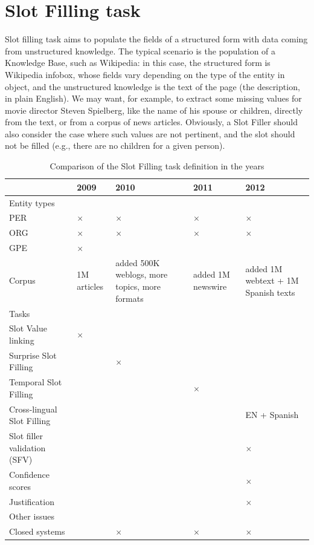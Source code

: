 \documentclass[a4paper,11pt]{report}
\newcommand{\tick}{$\times$}
\begin{document}
\section{Slot Filling task}
Slot filling task aims to populate the fields of a structured form with data coming from unstructured knowledge. The typical scenario is the population of a Knowledge Base, such as Wikipedia: in this case, the structured form is Wikipedia infobox, whose fields vary depending on the type of the entity in object, and the unstructured knowledge is the text of the page (the description, in plain English).
We may want, for example, to extract some missing values for movie director Steven Spielberg, like the name of his spouse or children, directly from the text, or from a corpus of news articles. Obviously, a Slot Filler should also consider the case where such values are not pertinent, and the slot should not be filled (e.g., there are no children for a given person).
\begin{table}
\begin{tabularx}{\linewidth}{lXXXX}
 & 2009 & 2010 & 2011 & 2012 \\
\hline Entity types \\ 
  PER & \tick & \tick & \tick & \tick \\
  ORG & \tick & \tick & \tick & \tick \\
  GPE & \tick & & & \\
\hline Corpus & 1M articles & added 500K weblogs, more topics, more formats & added 1M newswire & added 1M webtext + 1M Spanish texts \\
\hline Tasks\\ 
 Slot Value linking & \tick & & & \\
  Surprise Slot Filling & & \tick & & \\
  Temporal Slot Filling & & & \tick & \\
  Cross-lingual Slot Filling & & & & EN + Spanish \\
  Slot filler validation (SFV) & & & & \tick \\
  Confidence scores & & & & \tick \\
  Justification & & & & \tick \\
\hline Other issues\\ 
 Closed systems & & \tick & \tick & \tick \\
 
\end{tabularx}
\caption{Comparison of the Slot Filling task definition in the years}
\label{tab:sf}
\end{table}
\end{document}
